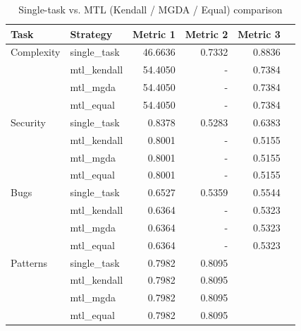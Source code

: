 \begin{table}[ht]
\centering
\caption{Single-task vs. MTL (Kendall / MGDA / Equal) comparison}
\label{tab:mtl_comparison}
\small
\begin{tabular}{llrrrr}
\toprule
Task & Strategy & Metric 1 & Metric 2 & Metric 3 \\
\midrule
  Complexity & single\_task & 46.6636 & 0.7332 & 0.8836 \\
   & mtl\_kendall & 54.4050 & - & 0.7384 \\
   & mtl\_mgda & 54.4050 & - & 0.7384 \\
   & mtl\_equal & 54.4050 & - & 0.7384 \\
\midrule
  Security & single\_task & 0.8378 & 0.5283 & 0.6383 \\
   & mtl\_kendall & 0.8001 & - & 0.5155 \\
   & mtl\_mgda & 0.8001 & - & 0.5155 \\
   & mtl\_equal & 0.8001 & - & 0.5155 \\
\midrule
  Bugs & single\_task & 0.6527 & 0.5359 & 0.5544 \\
   & mtl\_kendall & 0.6364 & - & 0.5323 \\
   & mtl\_mgda & 0.6364 & - & 0.5323 \\
   & mtl\_equal & 0.6364 & - & 0.5323 \\
\midrule
  Patterns & single\_task & 0.7982 & 0.8095 &  \\
   & mtl\_kendall & 0.7982 & 0.8095 &  \\
   & mtl\_mgda & 0.7982 & 0.8095 &  \\
   & mtl\_equal & 0.7982 & 0.8095 &  \\
\midrule
\bottomrule
\end{tabular}
\end{table}
